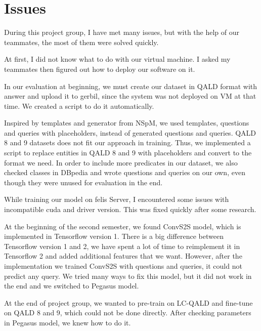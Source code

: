 
\section{Issues}

During this project group,
I have met many issues, 
but with the help of our teammates, 
the most of them were solved quickly.

At first, I did not know what to do with our virtual machine. 
I asked my teammates then figured out how to deploy our software on it. 

In our evaluation at beginning, 
we must create our dataset in QALD format with answer
and upload it to gerbil,
since the system was not deployed on VM at that time. 
We created a script to do it automatically. 

Inspired by templates and generator from NSpM,
we used templates, questions and queries with placeholders, 
instead of generated questions and queries.
QALD 8 and 9 datasets does not fit our approach in training. 
Thus, we implemented a script to replace entities in QALD 8 and 9 with placeholders
and convert to the format we need. 
In order to include more predicates in our dataset, 
we also checked classes in DBpedia 
and wrote questions and queries on our own,
even though they were unused for evaluation in the end. 

While training our model on felis Server, 
I encountered some issues with incompatible cuda and driver version. 
This was fixed quickly after some research. 

At the beginning of the second semester,
we found ConvS2S model,
which is implemented in Tensorflow version 1. 
There is a big difference between Tensorflow version 1 and 2,
we have spent a lot of time to reimplement it in Tensorflow 2
and added additional features that we want.
However, after the implementation we trained ConvS2S with questions and queries,
it could not predict any query. 
We tried many ways to fix this model, 
but it did not work in the end
and we switched to Pegasus model. 

At the end of project group, 
we wanted to pre-train on LC-QALD and fine-tune on QALD 8 and 9,
which could not be done directly. 
After checking parameters in Pegasus model, 
we knew how to do it. 